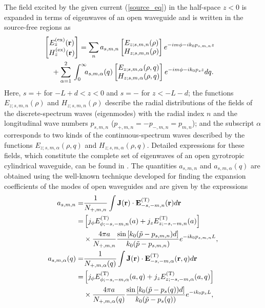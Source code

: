 \documentclass[summary]{URSIGASS2020}
\def\f{\phi}
\begin{document}
The field excited by the given current (\ref{source_eq}) in the half-space $ z<0 $ is expanded in terms of eigenwaves of an open waveguide and is written in the source-free regions as
\begin{align}\label{eq4} 
&\hspace{-4mm}\left[\!\!\!
\begin{array}{c}
{E_z^{(\rm ex)}}({\bf r})\\
{H_z^{(\rm ex)}}({\bf r})
\end{array}\!\!\!\right] = 
\sum_{n}a_{s,m,n}
\left[\!\!\!
\begin{array}{c}
{E}_{z;s,m,n}(\rho)\\
{H}_{z;s,m,n}(\rho)
\end{array}\!\!\!\right]e^{-im\f - ik_0 p_{s,m,n}z} \nonumber\\ 
&\hspace{0mm}+\sum_{\alpha=1}^2\,\int_{0}^{\infty}\!\!\!a_{s,m,\alpha}(q)
\left[\!\!\!
\begin{array}{c}
{E}_{z;s,m,\alpha}(\rho,q)\\
{H}_{z;s,m,\alpha}(\rho,q)
\end{array}\!\!\!\right]e^{-im\f - ik_0 p_{s} z}dq.
\end{align}
Here, $ s=+ $ for $ -L+d<z<0 $ and $ s=- $ for $ z<-L-d $; the functions $ E_{z;s,m,n}(\rho) $ and $ H_{z;s,m,n}(\rho) $ describe the radial distributions of the fields of the discrete-spectrum waves (eigenmodes) with the radial index $ n $ and the longitudinal wave numbers $ p_{s,m,n} $ ($ p_{+,m,n}=-p_{-,m,n}=p_{m,n} $);
and the subscript $ \alpha $ corresponds to two kinds of the continuous-spectrum waves described by the functions $ E_{z;s,m,\alpha}(\rho,q) $ and $ H_{z;s,m,\alpha}(\rho,q) $.
Detailed expressions for these fields, which constitute the complete set of eigenwaves of an open gyrotropic cylindrical waveguide, can be found in \cite{EskinPIERS2017_meth}.
The quantities $ a_{s,m,n} $ and $ a_{s,m,\alpha}(q) $ are obtained using the well-known technique developed for finding the expansion coefficients of the modes of open waveguides \cite{Kondrat'ev1999} and are given by the expressions
\begin{align}\label{eq5}
a_{s,m,n}=&\frac{1}{N_{+,m,n}} \int{\bf J}({\bf r})\cdot{\bf E}^{({\rm T})}_{-s,-m,n}({\bf r})d{\bf r} \nonumber\\
=&\left[j_{\phi}{E}^{({\rm T})}_{\phi;-s,-m,n}(a) + j_z {E}^{({\rm T})}_{z;-s,-m,n}(a)\right] \nonumber \\
&\times\frac{4\pi a}{N_{+,m,n}}\frac{\sin\left[k_0(\tilde{p} - p_{s,m,n})d\right]}{k_0(\tilde{p} - p_{s,m,n})}e^{-ik_0p_{s,m,n}L}, \nonumber\\
a_{s,m,\alpha}(q)=&\frac{1}{N_{+,m,\alpha}(q)} \int{\bf J}({\bf r})\cdot{\bf E}^{({\rm T})}_{-s,-m,\alpha}({\bf r},q)d{\bf r} \nonumber \\
=&\left[j_{\phi}{E}^{({\rm T})}_{\phi;-s,-m,\alpha}(a,q) + j_z {E}^{({\rm T})}_{z;-s,-m,\alpha}(a,q)\right] \nonumber \\
&\times\frac{4\pi a}{N_{+,m,\alpha}(q)} \frac{\sin\left[k_0(\tilde{p} - p_s(q))d\right]}{k_0(\tilde{p} - p_s(q))}e^{-ik_0p_{s}L}, 
\end{align}
\end{document}
